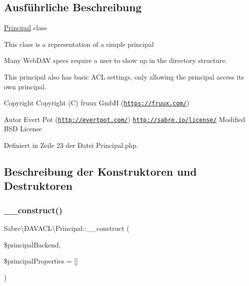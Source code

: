 \subsection{Ausführliche Beschreibung}
\mbox{\hyperlink{class_sabre_1_1_d_a_v_a_c_l_1_1_principal}{Principal}} class

This class is a representation of a simple principal

Many Web\+D\+AV specs require a user to show up in the directory structure.

This principal also has basic A\+CL settings, only allowing the principal access it\textquotesingle{}s own principal.

\begin{DoxyCopyright}{Copyright}
Copyright (C) fruux GmbH (\href{https://fruux.com/}{\tt https\+://fruux.\+com/}) 
\end{DoxyCopyright}
\begin{DoxyAuthor}{Autor}
Evert Pot (\href{http://evertpot.com/}{\tt http\+://evertpot.\+com/})  \href{http://sabre.io/license/}{\tt http\+://sabre.\+io/license/} Modified B\+SD License 
\end{DoxyAuthor}


Definiert in Zeile 23 der Datei Principal.\+php.



\subsection{Beschreibung der Konstruktoren und Destruktoren}
\mbox{\label{class_sabre_1_1_d_a_v_a_c_l_1_1_principal_ae70c556d73d012cd362c6bf805bec9f6}} 
\subsubsection{\texorpdfstring{\+\_\+\+\_\+construct()}{\_\_construct()}}
{\footnotesize\ttfamily Sabre\textbackslash{}\+D\+A\+V\+A\+C\+L\textbackslash{}\+Principal\+::\+\_\+\+\_\+construct (\begin{DoxyParamCaption}\item[{Principal\+Backend\textbackslash{}\+Backend\+Interface}]{\$principal\+Backend,  }\item[{array}]{\$principal\+Properties = {\ttfamily \mbox{[}\mbox{]}} }\end{DoxyParamCaption})}

